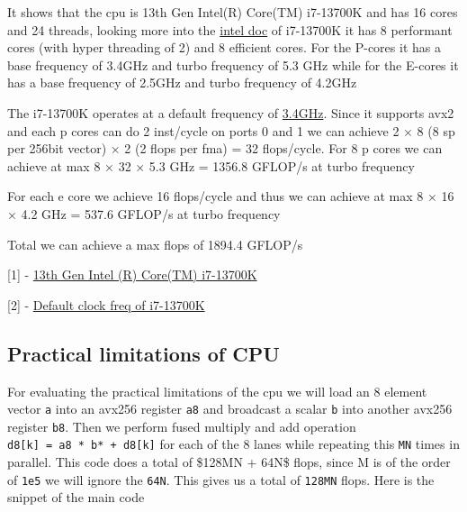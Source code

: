 It shows that the cpu is 13th Gen Intel(R) Core(TM) i7-13700K and has 16
cores and 24 threads, looking more into the
\href{https://www.intel.com/content/www/us/en/products/sku/230500/intel-core-i713700k-processor-30m-cache-up-to-5-40-ghz/specifications.html}{intel
doc} of i7-13700K it has 8 performant cores (with hyper threading of 2)
and 8 efficient cores. For the P-cores it has a base frequency of 3.4GHz
and turbo frequency of 5.3 GHz while for the E-cores it has a base
frequency of 2.5GHz and turbo frequency of 4.2GHz

The i7-13700K operates at a default frequency of
\href{https://www.techpowerup.com/cpu-specs/core-i7-13700k.c2850}{3.4GHz}.
Since it supports avx2 and each p cores can do 2 inst/cycle on ports 0
and 1 we can achieve 2 × 8 (8 sp per 256bit vector) × 2 (2 flops per
fma) = 32 flops/cycle. For 8 p cores we can achieve at max 8 × 32 × 5.3
GHz = 1356.8 GFLOP/s at turbo frequency

For each e core we achieve 16 flops/cycle and thus we can achieve at max
8 × 16 × 4.2 GHz = 537.6 GFLOP/s at turbo frequency

Total we can achieve a max flops of 1894.4 GFLOP/s

{[}1{]} -
\href{https://www.intel.com/content/www/us/en/products/sku/230500/intel-core-i713700k-processor-30m-cache-up-to-5-40-ghz/specifications.html}{13th
Gen Intel (R) Core(TM) i7-13700K}

{[}2{]} -
\href{https://www.techpowerup.com/cpu-specs/core-i7-13700k.c2850}{Default
clock freq of i7-13700K}

\hypertarget{practical-limitations-of-cpu}{%
\subsection{Practical limitations of
CPU}\label{practical-limitations-of-cpu}}

For evaluating the practical limitations of the cpu we will load an 8
element vector \texttt{a} into an avx256 register \texttt{a8} and
broadcast a scalar \texttt{b} into another avx256 register \texttt{b8}.
Then we perform fused multiply and add operation
\texttt{d8{[}k{]}\ =\ a8\ *\ b*\ +\ d8{[}k{]}} for each of the 8 lanes
while repeating this \texttt{MN} times in parallel. This code does a
total of \$128MN + 64N\$ flops, since M is of the order of \texttt{1e5}
we will ignore the \texttt{64N}. This gives us a total of \texttt{128MN}
flops. Here is the snippet of the main code

